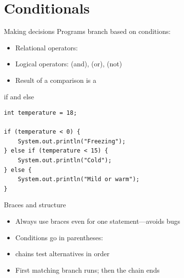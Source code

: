 \documentclass[aspectratio=169,11pt]{beamer}
\begin{document}
    \section{Conditionals}

    \begin{frame}{Making decisions}
        Programs branch based on conditions:
        \begin{itemize}
            \item Relational operators: \javacode{==} \javacode{!=} \javacode{<} \javacode{>} \javacode{<=} \javacode{>=}
            \item Logical operators: \javacode{\&\&} (and), \javacode{||} (or), \javacode{!} (not)
            \item Result of a comparison is a 
        \end{itemize}
    \end{frame}

    \begin{frame}[fragile]{if and else}
        \begin{lstlisting}
int temperature = 18;

if (temperature < 0) {
    System.out.println("Freezing");
} else if (temperature < 15) {
    System.out.println("Cold");
} else {
    System.out.println("Mild or warm");
}
        \end{lstlisting}
    \end{frame}

    \begin{frame}{Braces and structure}
        \begin{itemize}
            \item Always use braces \javacode{\{} \javacode{\}} even for one statement---avoids bugs
            \item Conditions go in parentheses: 
            \item {} chains test alternatives in order
            \item First matching branch runs; then the chain ends
        \end{itemize}
        \vspace{0.4em}
    \end{frame}
\end{document}
